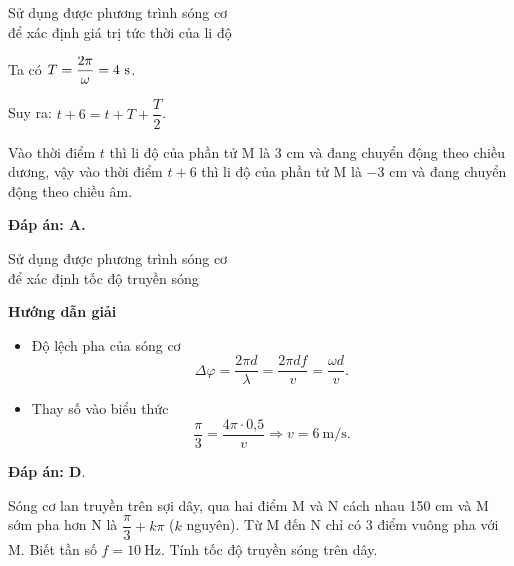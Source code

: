 \begin{dang}{Sử dụng được phương trình sóng cơ\\ để xác định giá trị tức thời của li độ}
{		Ta có $T=\dfrac{2\pi}{\omega} = 4\ \text s$.
		
		Suy ra: $t+6 = t + T + \dfrac{T}{2}$. 
		
		Vào thời điểm $t$ thì li độ của phần tử M là 3 cm và đang chuyển động theo chiều dương, vậy vào thời điểm $t+6$ thì li độ của phần tử M là $-3$ cm và đang chuyển động theo chiều âm.
		
		\textbf{Đáp án: A.}
		
	}
	
\end{dang}
\begin{dang}{Sử dụng được phương trình sóng cơ\\ để xác định tốc độ truyền sóng}
	{
		\begin{center}
			\textbf{Hướng dẫn giải}
		\end{center}
		
		\begin{itemize}
			\item Độ lệch pha của sóng cơ
			\begin{equation*}
				\Delta \varphi =\dfrac{2\pi d}{\lambda} = \dfrac{2\pi d f}{v}=\dfrac{\omega d}{v}.
			\end{equation*}
			\item Thay số vào biểu thức 
			\begin{equation*}
				\dfrac{\pi}{3} =\dfrac{4\pi \cdot \text{0,5}}{v}  \Rightarrow v = 6\ \text{m/s}.
			\end{equation*}
		\end{itemize}
		
		
		\textbf{Đáp án: D}.
	}
	
	{
		Sóng cơ lan truyền trên sợi dây, qua hai điểm M và N cách nhau 150 cm và M sớm pha hơn N là $\dfrac{\pi}{3} + k\pi$ ($k$ nguyên). Từ M đến N chỉ có 3 điểm vuông pha với M. Biết tần số $f=10\ \text{Hz}$. Tính tốc độ truyền sóng trên dây. 
		
}
\end{dang}
